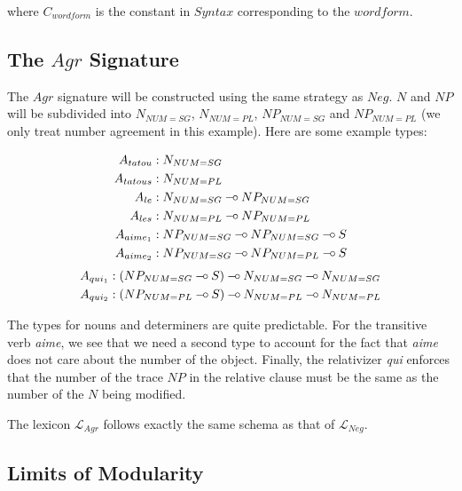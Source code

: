 \documentclass{llncs}
\def\limp {\mathbin{{-}\mkern-3.5mu{\circ}}}
\begin{document}
where $C_{wordform}$ is the constant in $Syntax$ corresponding to the
$wordform$.

\subsection{The $Agr$ Signature}

The $Agr$ signature will be constructed using the same strategy as $Neg$. $N$
and $NP$ will be subdivided into $N_{NUM{=}SG}$, $N_{NUM{=}PL}$,
$NP_{NUM{=}SG}$ and $NP_{NUM{=}PL}$ (we only treat number agreement in this
example). Here are some example types:

\vspace{-3ex}

\begin{align*}
A_{tatou} &: N_{NUM{=}SG} \\
A_{tatous} &: N_{NUM{=}PL} \\
A_{le} &: N_{NUM{=}SG} \limp NP_{NUM{=}SG} \\
A_{les} &: N_{NUM{=}PL} \limp NP_{NUM{=}PL} \\
A_{aime_1} &: NP_{NUM{=}SG} \limp NP_{NUM{=}SG} \limp S \\
A_{aime_2} &: NP_{NUM{=}SG} \limp NP_{NUM{=}PL} \limp S
\end{align*}
\begin{align*}
A_{qui_1} &: (NP_{NUM{=}SG} \limp S) \limp N_{NUM{=}SG} \limp N_{NUM{=}SG} \\
A_{qui_2} &: (NP_{NUM{=}PL} \limp S) \limp N_{NUM{=}PL} \limp N_{NUM{=}PL}
\end{align*}

The types for nouns and determiners are quite predictable. For the transitive
verb \emph{aime}, we see that we need a second type to account for the fact
that \emph{aime} does not care about the number of the object. Finally, the
relativizer \emph{qui} enforces that the number of the trace $NP$ in the
relative clause must be the same as the number of the $N$ being modified.

The lexicon $\mathcal{L}_{Agr}$ follows exactly the same schema as that of
$\mathcal{L}_{Neg}$.

\subsection{Limits of Modularity}
\end{document}
